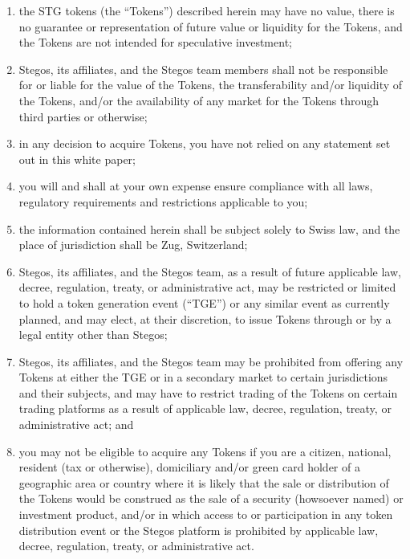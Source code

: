 \documentclass[8pt,fleqn,openany]{book}
\begin{document}
\begin{enumerate}[label=(\alph*)]
	\item the STG tokens (the “Tokens”) described herein may have no value, there is no guarantee or representation of future value or liquidity for the Tokens, and the Tokens are not intended for speculative investment; 

	\item Stegos, its affiliates, and the Stegos team members shall not be responsible for or liable for the value of the Tokens, the transferability and/or liquidity of the Tokens, and/or the availability of any market for the Tokens through third parties or otherwise; 

	\item in any decision to acquire Tokens, you have not relied on any statement set out in this white paper; 

	\item you will and shall at your own expense ensure compliance with all laws, regulatory requirements and restrictions applicable to you; 

	\item the information contained herein shall be subject solely to Swiss law, and the place of jurisdiction shall be Zug, Switzerland; 

	\item Stegos, its affiliates, and the Stegos team, as a result of future applicable law, decree, regulation, treaty, or administrative act, may be restricted or limited to hold a token generation event (“TGE”) or any similar event as currently planned, and may elect, at their discretion, to issue Tokens through or by a legal entity other than Stegos; 

	\item Stegos, its affiliates, and the Stegos team may be prohibited from offering any Tokens at either the TGE or in a secondary market to certain jurisdictions and their subjects, and may have to restrict trading of the Tokens on certain trading platforms as a result of applicable law, decree, regulation, treaty, or administrative act; and 

	\item you may not be eligible to acquire any Tokens if you are a citizen, national, resident (tax or otherwise), domiciliary and/or green card holder of a geographic area or country where it is likely that the sale or distribution of the Tokens would be construed as the sale of a security (howsoever named) or investment product, and/or in which access to or participation in any token distribution event or the Stegos platform is prohibited by applicable law, decree, regulation, treaty, or administrative act. 

\end{enumerate}
\end{document}
